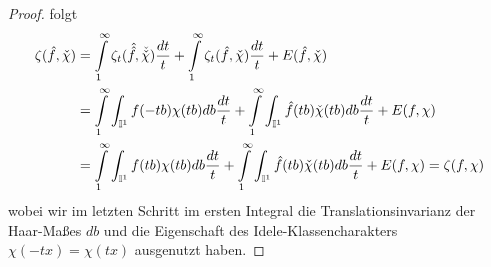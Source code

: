 \begin{proof}
	folgt
	\begin{align*}
		\zeta(\hat{f},\check{\chi}) 
			&=  \int\limits_1^\infty \zeta_t(\hat{\hat{f}}, \check{\check{\chi}}) \frac{dt}{t} 
				+ \int\limits_1^\infty \zeta_t(\hat{f},\check{\chi}) \frac{dt}{t} + E(\hat{f},\check{\chi})\\
			&= \int\limits_1^\infty \int_{\mathbb{I}^1}f(-tb)\chi(tb)db  \frac{dt}{t} 
				+ \int\limits_1^\infty \int_{\mathbb{I}^1}\hat{f}(tb)\check{\chi}(tb)db  \frac{dt}{t} +E(f,\chi)\\
			&= \int\limits_1^\infty \int_{\mathbb{I}^1}f(tb)\chi(tb)db  \frac{dt}{t} 
				+ \int\limits_1^\infty \int_{\mathbb{I}^1}\hat{f}(tb)\check{\chi}(tb)db  \frac{dt}{t} +E(f,\chi) = \zeta(f,\chi)
	\end{align*}
	wobei wir im letzten Schritt im ersten Integral die Translationsinvarianz der Haar-Maßes $db$ und die Eigenschaft des Idele-Klassencharakters $\chi(-tx) = \chi(tx)$ ausgenutzt haben.
\end{proof}